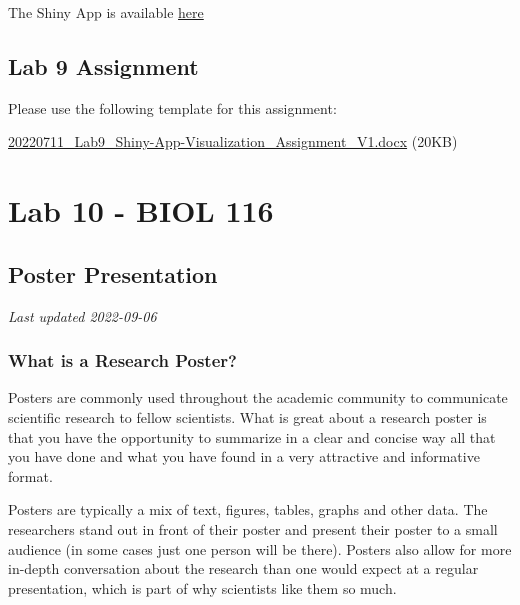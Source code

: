 \documentclass[
]{book}
\begin{document}
The Shiny App is available \href{https://openscience.ok.ubc.ca/shiny/BIOL-116/}{here}

\hypertarget{lab-9-assignment}{%
\chapter*{Lab 9 Assignment}\label{lab-9-assignment}}

Please use the following template for this assignment:

\href{https://osf.io/download/qjbdv}{20220711\_Lab9\_Shiny-App-Visualization\_Assignment\_V1.docx} (20KB)

\hypertarget{part-lab-10---biol-116}{%
\part*{Lab 10 - BIOL 116}\label{part-lab-10---biol-116}}

\hypertarget{poster-presentation}{%
\chapter*{Poster Presentation}\label{poster-presentation}}

\emph{Last updated 2022-09-06}

\hypertarget{what-is-a-research-poster}{%
\section*{What is a Research Poster?}\label{what-is-a-research-poster}}

Posters are commonly used throughout the academic community to communicate scientific research to fellow scientists. What is great about a research poster is that you have the opportunity to summarize in a clear and concise way all that you have done and what you have found in a very attractive and informative format.

Posters are typically a mix of text, figures, tables, graphs and other data. The researchers stand out in front of their poster and present their poster to a small audience (in some cases just one person will be there). Posters also allow for more in-depth conversation about the research than one would expect at a regular presentation, which is part of why scientists like them so much.
\end{document}
